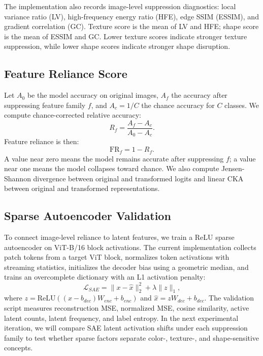 \documentclass[letterpaper]{article}
\begin{document}
The implementation also records image-level suppression diagnostics: local
variance ratio (LV), high-frequency energy ratio (HFE), edge SSIM (ESSIM), and
gradient correlation (GC). Texture score is the mean of LV and HFE; shape score
is the mean of ESSIM and GC. Lower texture scores indicate stronger texture
suppression, while lower shape scores indicate stronger shape disruption.

\subsection{Feature Reliance Score}

Let $A_0$ be the model accuracy on original images, $A_f$ the accuracy after
suppressing feature family $f$, and $A_c = 1/C$ the chance accuracy for $C$
classes. We compute chance-corrected relative accuracy:
\begin{equation}
    R_f = \frac{A_f - A_c}{A_0 - A_c}.
\end{equation}
Feature reliance is then:
\begin{equation}
    \mathrm{FR}_f = 1 - R_f.
\end{equation}
A value near zero means the model remains accurate after suppressing $f$; a
value near one means the model collapses toward chance. We also compute
Jensen-Shannon divergence between original and transformed logits and linear CKA
between original and transformed representations.

\subsection{Sparse Autoencoder Validation}

To connect image-level reliance to latent features, we train a ReLU sparse
autoencoder on ViT-B/16 block activations. The current implementation collects
patch tokens from a target ViT block, normalizes token activations with
streaming statistics, initializes the decoder bias using a geometric median,
and trains an overcomplete dictionary with an L1 activation penalty:
\begin{equation}
    \mathcal{L}_{SAE}
    = \|x - \hat{x}\|_2^2 + \lambda \|z\|_1,
\end{equation}
where $z = \mathrm{ReLU}((x-b_{dec})W_{enc}+b_{enc})$ and
$\hat{x}=zW_{dec}+b_{dec}$. The validation script measures reconstruction MSE,
normalized MSE, cosine similarity, active latent counts, latent frequency, and
label entropy. In the next experimental iteration, we will compare SAE latent
activation shifts under each suppression family to test whether sparse factors
separate color-, texture-, and shape-sensitive concepts.
\end{document}
